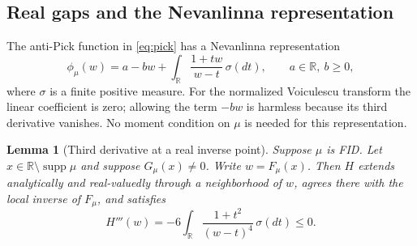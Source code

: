 \documentclass[11pt,a4paper]{article}
\newtheorem{lemma}[theorem]{Lemma}
\theoremstyle{definition}
\theoremstyle{remark}
\newcommand{\R}{\mathbb R}
\DeclareMathOperator{\supp}{supp}
\begin{document}
\subsection{Real gaps and the Nevanlinna representation}

The anti-Pick function in \eqref{eq:pick} has a Nevanlinna
representation
\begin{equation}\label{eq:nevanlinna}
 \phi_\mu(w)
 =a-bw+\int_\R\frac{1+tw}{w-t}\,\sigma(dt),
 \qquad a\in\R,\ b\ge0,
\end{equation}
where $\sigma$ is a finite positive measure. For the normalized
Voiculescu transform the linear coefficient is zero; allowing the
term $-bw$ is harmless because its third derivative vanishes.
No moment condition on $\mu$ is needed for this representation.

\begin{lemma}[Third derivative at a real inverse point]\label{lem:sign}
Suppose $\mu$ is FID. Let $x\in\R\setminus\supp\mu$ and suppose
$G_\mu(x)\ne0$. Write $w=F_\mu(x)$. Then $H$ extends analytically
and real-valuedly through a neighborhood of $w$, agrees there with
the local inverse of $F_\mu$, and satisfies
\begin{equation}\label{eq:H-third-sign}
 H'''(w)
 =-6\int_\R\frac{1+t^2}{(w-t)^4}\,\sigma(dt)\le0.
\end{equation}
\end{lemma}
\end{document}
